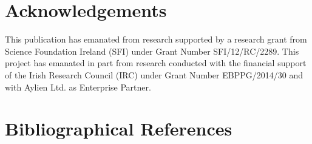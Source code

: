 \documentclass[10pt, a4paper]{article}
\begin{document}
\section*{Acknowledgements}

This publication has emanated from research supported by a research grant from Science Foundation Ireland (SFI) under Grant Number SFI/12/RC/2289.
This project has emanated in part from research conducted with the financial support of the Irish Research Council (IRC) under Grant Number EBPPG/2014/30 and with Aylien Ltd. as Enterprise Partner. 

\section{Bibliographical References}
\label{main:ref}


% 

\end{document}
